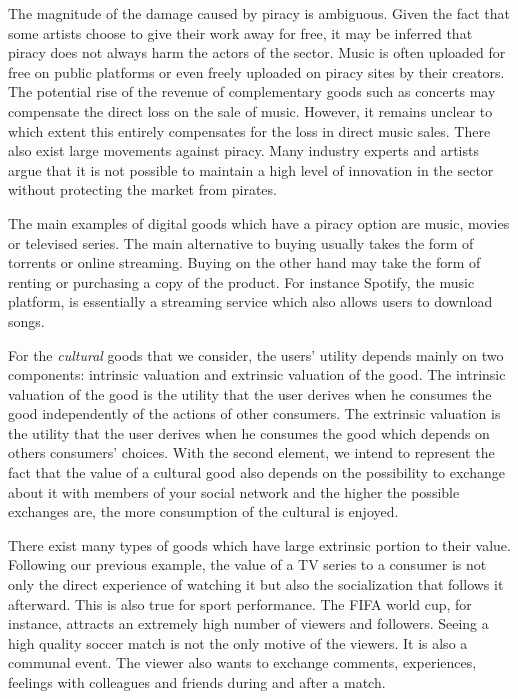 The magnitude of the damage caused by piracy is ambiguous. Given the fact that some artists choose to give their work away for free, it may be inferred that piracy does not always harm the actors of the sector. Music is often uploaded for free on public platforms or even freely uploaded on piracy sites by their creators. The potential rise of the revenue of complementary goods such as concerts may compensate the direct loss on the sale of music. However, it remains unclear to which extent this entirely compensates for the loss in direct music sales. There also exist large movements against piracy. Many industry experts and artists argue that it is not possible to maintain a high level of innovation in the sector without protecting the market from pirates.

The main examples of digital goods which have a piracy option are music, movies or televised series. The main alternative to buying usually takes the form of torrents or online streaming. Buying on the other hand may take the form of renting or purchasing a copy of the product. For instance Spotify, the music platform, is essentially a streaming service which also allows users to download songs.

For the \textit{cultural} goods that we consider, the users' utility depends mainly on two components:  intrinsic valuation and extrinsic valuation of the good. The intrinsic valuation of the good is the utility that the user derives when he consumes the good independently of the actions of other consumers. The extrinsic valuation is the utility that the user derives when he consumes the good which depends on others consumers' choices. With the second element, we intend to represent the fact that the value of a cultural good also depends on the possibility to exchange about it with members of your social network and the higher the possible exchanges are, the more consumption of the cultural is enjoyed. 


There exist many types of goods which have large extrinsic portion to their value. Following our previous example, the value of a TV series to a consumer is not only the direct experience of watching it but also the socialization that follows it afterward. This is also true for sport performance. The FIFA world cup, for instance, attracts an extremely high number of viewers and followers. Seeing a high quality soccer match is not the only motive of the viewers. It is also a communal event. The viewer also wants to exchange comments, experiences, feelings with colleagues and friends during and after a match. 

